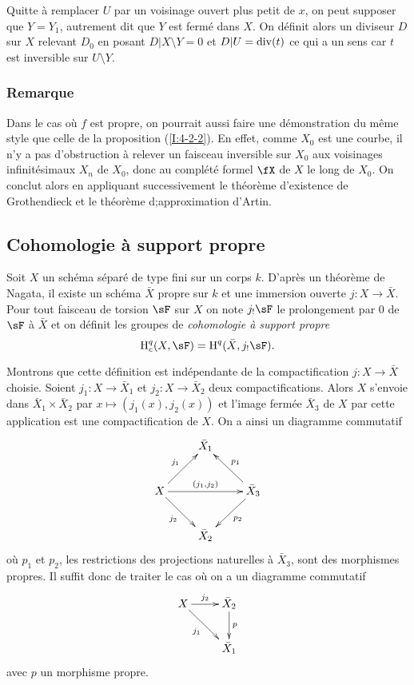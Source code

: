 Quitte à remplacer $U$ par un voisinage ouvert plus petit de $x$, on peut 
supposer que $Y=Y_1$, autrement dit que $Y$ est fermé dans $X$. On définit 
alors un diviseur $D$ sur $X$ relevant $D_0$ en posant $D|X\setminus Y=0$ et 
$D|U=\operatorname{div}(t)$ ce qui a un sens car $t$ est inversible sur $U\setminus Y$. 





\subsubsection{Remarque}\label{I:4-4-2}

Dans le cas où $f$ est propre, on pourrait aussi faire une démonstration 
du même style que celle de la proposition (\ref{I:4-2-2}). En effet, comme 
$X_0$ est une courbe, il n'y a pas d'obstruction à relever un faisceau 
inversible sur $X_0$ aux voisinages infinitésimaux $X_n$ de $X_0$, donc au 
complété formel $\fX$ de $X$ le long de $X_0$. On conclut alors en 
appliquant successivement le théorème d'existence de Grothendieck et le 
théorème d;approximation d'Artin. 










\subsection{Cohomologie à support propre}\label{I:4-5}





\begin{definition}\label{I:4-5-1}
Soit $X$ un schéma séparé de type fini sur un corps $k$. D'après un 
théorème de Nagata, il existe un schéma $\bar X$ propre sur $k$ et une 
immersion ouverte $j:X\to\bar X$. Pour tout faisceau de torsion $\sF$ sur $X$ on 
note $j_! \sF$ le prolongement par $0$ de $\sF$ à $\bar X$ et on définit les 
groupes de \emph{cohomologie à support propre} 
\[
  \h_c^q(X,\sF)=\h^q(\bar X, j_! \sF) \text{.}
\]
\end{definition}

Montrons que cette définition est indépendante de la compactification 
$j:X\to\bar X$ choisie. Soient $j_1:X\to \bar X_1$ et $j_2:X\to \bar X_2$ deux 
compactifications. Alors $X$ s'envoie dans $\bar X_1\times \bar X_2$ par 
$x\mapsto (j_1(x),j_2(x))$ et l'image fermée $\bar X_3$ de $X$ par cette 
application est une compactification de $X$. On a ainsi un diagramme commutatif 
\[\xymatrix{
  & \bar X_1 \\
  X \ar[ur]^-{j_1} \ar[rr]^-{(j_1,j_2)} \ar[dr]_-{j_2} 
    & & \bar X_3 \ar[ul]_-{p_1} \ar[dl]^-{p_2} \\
  & \bar X_2
}\]
où $p_1$ et $p_2$, les restrictions des projections naturelles à 
$\bar X_3$, sont des morphismes propres. Il suffit donc de traiter le cas où 
on a un diagramme commutatif 
\[\xymatrix{
  X \ar[r]^-{j_2} \ar[dr]_-{j_1} 
    & \bar X_2 \ar[d]^-p \\
  & \bar X_1
}\]
avec $p$ un morphisme propre. 





